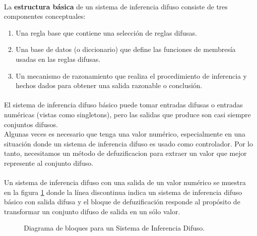\documentclass[12pt,letterpaper,oneside] {memoir}
\begin{document}
\paragraph{}
La \textbf{estructura básica} de un sistema de inferencia difuso consiste de tres componentes conceptuales: 
\begin{enumerate}
\item Una regla base que contiene una selección de reglas difusas.
\item Una base de datos (o diccionario) que define las funciones de membresía usadas en las reglas difusas.
\item Un mecanismo de razonamiento que realiza el procedimiento de inferencia y hechos dados para obtener una salida razonable o conclusión.
\end{enumerate}
\paragraph*{}

El sistema de inferencia difuso básico puede tomar entradas difusas o entradas numéricas (vistas como singletons), pero las salidas que produce son casi siempre conjuntos difusos.\\
Algunas veces es necesario  que tenga una valor numérico, especialmente en una situación donde un sistema de inferencia difuso es usado como controlador. Por lo tanto,  necesitamos un método de defuzificacion para extraer un valor que mejor represente al conjunto difuso. 
\paragraph{}
Un sistema de inferencia difuso  con una salida de un valor numérico se muestra en la figura \ref{fig:fuzzy11} \citep{Jang1997} donde la línea discontinua indica un sistema de inferencia difuso básico con salida difusa y el bloque de defuzificación  responde al propósito de transformar un conjunto difuso de salida en un sólo valor. \\

\begin{figure}[H] 
 \centering 
{} \caption{Diagrama de bloques para un Sistema de Inferencia Difuso.} 
 \label{fig:fuzzy11} 
\end{figure}
\end{document}
